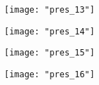 \newpage
\vfill
\begin{figure}[H]
    \centering
    \texttt{[image: "pres\_13"]}
\end{figure}
\vfill






\newpage
\vfill
\begin{figure}[H]
    \centering
    \texttt{[image: "pres\_14"]}
\end{figure}
\vfill








\newpage
\vfill
\begin{figure}[H]
    \centering
    \texttt{[image: "pres\_15"]}
\end{figure}
\vfill





\newpage
\vfill
\begin{figure}[H]
    \centering
    \texttt{[image: "pres\_16"]}
\end{figure}
\vfill

